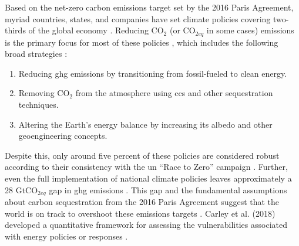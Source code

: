 Based on the net-zero carbon emissions target set by the 2016 Paris Agreement,
myriad countries, states, and companies have set climate policies covering
two-thirds of the global economy \cite{hale_assessing_2022}. Reducing CO$_2$ (or
CO$_{2eq}$ in some cases) emissions is the primary focus for most of these
policies \cite{fawzy_strategies_2020, roelfsema_taking_2020,
hale_assessing_2022}, which includes the following broad strategies
\cite{fawzy_strategies_2020}:
\begin{enumerate}
    \item Reducing \ac{ghg} emissions by transitioning from fossil-fueled to
    clean energy.
    \item Removing CO$_2$ from the atmosphere using \ac{ccs} and other
    sequestration techniques.
    \item Altering the Earth's energy balance by increasing its albedo and other
    geoengineering concepts.
\end{enumerate}
Despite this, only around five percent of these policies are considered
robust according to their consistency with the \ac{un} ``Race to Zero'' campaign
\cite{hale_assessing_2022}. Further, even the full implementation of national
climate policies leaves approximately  a 28 GtCO$_{2eq}$ gap in \ac{ghg}
emissions \cite{roelfsema_taking_2020}. This gap and the fundamental
assumptions about carbon sequestration from the 2016 Paris Agreement suggest
that the world is on track to overshoot these emissions targets
\cite{roelfsema_taking_2020,taylor_managing_2021}. Carley et al. (2018)
developed a quantitative framework for assessing the vulnerabilities associated
with energy policies or responses \cite{carley_framework_2018}.


